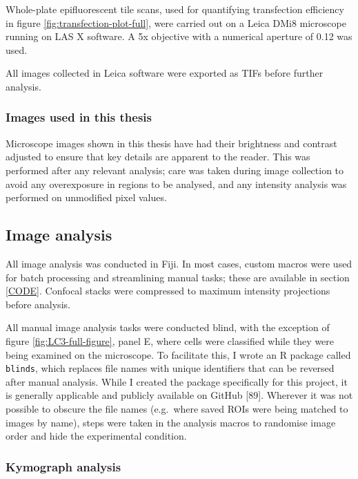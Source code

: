 \documentclass[
  12pt,
  a4paper,
]{book}
\begin{document}
Whole-plate epifluorescent tile scans, used for quantifying transfection efficiency in figure \ref{fig:transfection-plot-full}, were carried out on a Leica DMi8 microscope running on LAS X software. A 5x objective with a numerical aperture of 0.12 was used.

All images collected in Leica software were exported as TIFs before further analysis.

\hypertarget{images-used-in-this-thesis}{%
\subsubsection{Images used in this thesis}\label{images-used-in-this-thesis}}

Microscope images shown in this thesis have had their brightness and contrast adjusted to ensure that key details are apparent to the reader. This was performed after any relevant analysis; care was taken during image collection to avoid any overexposure in regions to be analysed, and any intensity analysis was performed on unmodified pixel values.

\hypertarget{image-analysis}{%
\subsection{Image analysis}\label{image-analysis}}

All image analysis was conducted in Fiji. In most cases, custom macros were used for batch processing and streamlining manual tasks; these are available in section \ref{CODE}. Confocal stacks were compressed to maximum intensity projections before analysis.

All manual image analysis tasks were conducted blind, with the exception of figure \ref{fig:LC3-full-figure}, panel E, where cells were classified while they were being examined on the microscope. To facilitate this, I wrote an R package called \texttt{blinds}, which replaces file names with unique identifiers that can be reversed after manual analysis. While I created the package specifically for this project, it is generally applicable and publicly available on GitHub {[}89{]}. Wherever it was not possible to obscure the file names (e.g.~where saved ROIs were being matched to images by name), steps were taken in the analysis macros to randomise image order and hide the experimental condition.

\hypertarget{kymo}{%
\subsubsection{Kymograph analysis}\label{kymo}}
\end{document}
